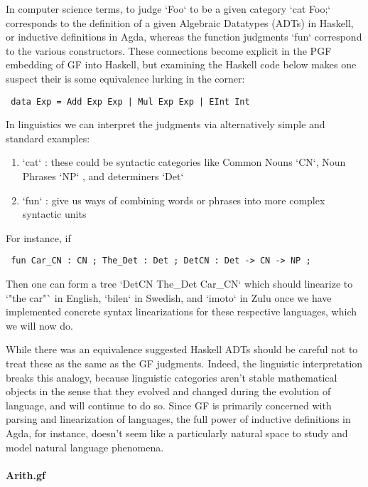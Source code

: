 \documentclass[11pt, a4paper]{article}
\begin{document}
In computer science terms, to judge `Foo` to be a given category `cat Foo;`
corresponds to the definition of a given Algebraic Datatypes (ADTs) in Haskell,
or inductive definitions in Agda, whereas the function judgments `fun`
correspond to the various constructors. These connections become explicit in the
PGF embedding of GF into Haskell, but examining the Haskell code below makes one
suspect their is some equivalence lurking in the corner:

\begin{verbatim} data Exp = Add Exp Exp | Mul Exp Exp | EInt Int
\end{verbatim}

In linguistics we can interpret the judgments via alternatively simple and
standard examples:

\begin{enumerate}
\item `cat` : these could be syntactic categories like Common Nouns `CN`, Noun
Phrases `NP` , and determiners `Det`
\item `fun` : give us ways of combining words or phrases into more complex
syntactic units
\end {enumerate}

For instance, if

\begin{verbatim} fun Car_CN : CN ; The_Det : Det ; DetCN : Det -> CN -> NP ;
\end{verbatim}

Then one can form a tree `DetCN The_Det Car_CN` which should linearize to `"the
car"` in English, `bilen` in Swedish, and `imoto` in Zulu once we have
implemented concrete syntax linearizations for these respective languages, which
we will now do.

While there was an equivalence suggested Haskell ADTs should be careful not to
treat these as the same as the GF judgments. Indeed, the linguistic
interpretation breaks this analogy, because linguistic categories aren't stable
mathematical objects in the sense that they evolved and changed during the
evolution of language, and will continue to do so. Since GF is primarily
concerned with parsing and linearization of languages, the full power of
inductive definitions in Agda, for instance, doesn't seem like a particularly
natural space to study and model natural language phenomena.


\paragraph{Arith.gf}
\end{document}
